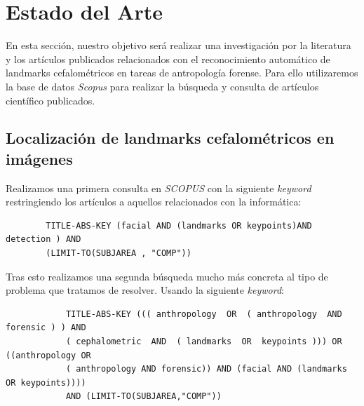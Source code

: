 
\chapter{Estado del Arte}

    \noindent En esta sección, nuestro objetivo será realizar una investigación por la literatura y los artículos publicados relacionados con el reconocimiento automático de landmarks cefalométricos en tareas de antropología forense. Para ello utilizaremos la base de datos \textit{Scopus} para realizar la búsqueda y consulta de artículos científico publicados.

    \section{Localización de landmarks cefalométricos en imágenes}

        \noindent Realizamos una primera consulta en \textit{SCOPUS} con la siguiente \textit{keyword} restringiendo los artículos a aquellos relacionados con la informática:
        
        \begin{verbatim}
        TITLE-ABS-KEY (facial AND (landmarks OR keypoints)AND  detection ) AND 
        (LIMIT-TO(SUBJAREA , "COMP"))
        \end{verbatim}

        \medskip

        \noindent Tras esto realizamos una segunda búsqueda mucho más concreta al tipo de problema que tratamos de resolver. Usando la siguiente \textit{keyword}:

        \begin{verbatim}
            TITLE-ABS-KEY ((( anthropology  OR  ( anthropology  AND  forensic ) ) AND  
            ( cephalometric  AND  ( landmarks  OR  keypoints ))) OR ((anthropology OR  
            ( anthropology AND forensic)) AND (facial AND (landmarks OR keypoints))))  
            AND (LIMIT-TO(SUBJAREA,"COMP"))
        \end{verbatim}

